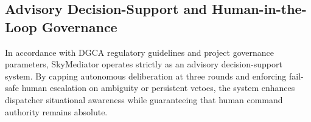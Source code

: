 \subsection{Advisory Decision-Support and Human-in-the-Loop Governance}
In accordance with DGCA regulatory guidelines and project governance parameters, SkyMediator operates strictly as an advisory decision-support system. By capping autonomous deliberation at three rounds and enforcing fail-safe human escalation on ambiguity or persistent vetoes, the system enhances dispatcher situational awareness while guaranteeing that human command authority remains absolute.

